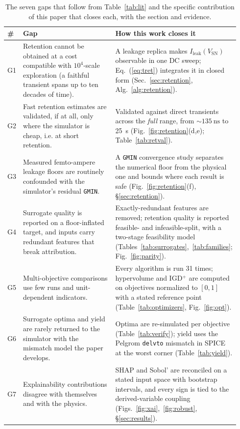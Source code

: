 \documentclass[11pt,a4paper]{article}
\newcommand{\Vsn}{V_{\mathrm{SN}}}
\newcommand{\Ileak}{I_{\mathrm{leak}}}
\begin{document}
\begin{table}[!ht]
\centering
\caption{The seven gaps that follow from Table~\ref{tab:lit} and the specific
contribution of this paper that closes each, with the section and evidence.}
\label{tab:gaps}
\footnotesize
\begin{tabular}{@{}p{0.045\linewidth}p{0.40\linewidth}p{0.50\linewidth}@{}}
\toprule
\textbf{\#} & \textbf{Gap} & \textbf{How this work closes it} \\
\midrule
G1 & Retention cannot be obtained at a cost compatible with $10^{4}$-scale
exploration (a faithful transient spans up to ten decades of time). &
A leakage replica makes $\Ileak(\Vsn)$ observable in one DC sweep; Eq.~(\ref{eq:tret})
integrates it in closed form (Sec.~\ref{sec:retention}, Alg.~\ref{alg:retention}). \\
\addlinespace
G2 & Fast retention estimates are validated, if at all, only where the simulator
is cheap, i.e. at short retention. &
Validated against direct transients across the \emph{full} range, from
$\sim\!\SI{135}{\nano\second}$ to \SI{25}{\second}
(Fig.~\ref{fig:retention}(d,e); Table~\ref{tab:retval}). \\
\addlinespace
G3 & Measured femto-ampere leakage floors are routinely confounded with the
simulator's residual \texttt{GMIN}. &
A \texttt{GMIN} convergence study separates the numerical floor from the physical
one and bounds where each result is safe (Fig.~\ref{fig:retention}(f), \S\ref{sec:retention}). \\
\addlinespace
G4 & Surrogate quality is reported on a floor-inflated target, and inputs carry
redundant features that break attribution. &
Exactly-redundant features are removed; retention quality is reported feasible-
and infeasible-split, with a two-stage feasibility model
(Tables~\ref{tab:surrogates},~\ref{tab:families}; Fig.~\ref{fig:parity}). \\
\addlinespace
G5 & Multi-objective comparisons use few runs and unit-dependent indicators. &
Every algorithm is run 31 times; hypervolume and IGD$^{+}$ are computed on
objectives normalized to $[0,1]$ with a stated reference point
(Table~\ref{tab:optimizers}, Fig.~\ref{fig:opt}). \\
\addlinespace
G6 & Surrogate optima and yield are rarely returned to the simulator with the
mismatch model the paper develops. &
Optima are re-simulated per objective (Table~\ref{tab:verify}); yield uses the
Pelgrom \texttt{delvto} mismatch in SPICE at the worst corner
(Table~\ref{tab:yield}). \\
\addlinespace
G7 & Explainability contributions disagree with themselves and with the physics. &
SHAP and Sobol' are reconciled on a stated input space with bootstrap intervals,
and every sign is tied to the derived-variable coupling
(Figs.~\ref{fig:xai},~\ref{fig:robust}, \S\ref{sec:results}). \\
\bottomrule
\end{tabular}
\end{table}
\end{document}
